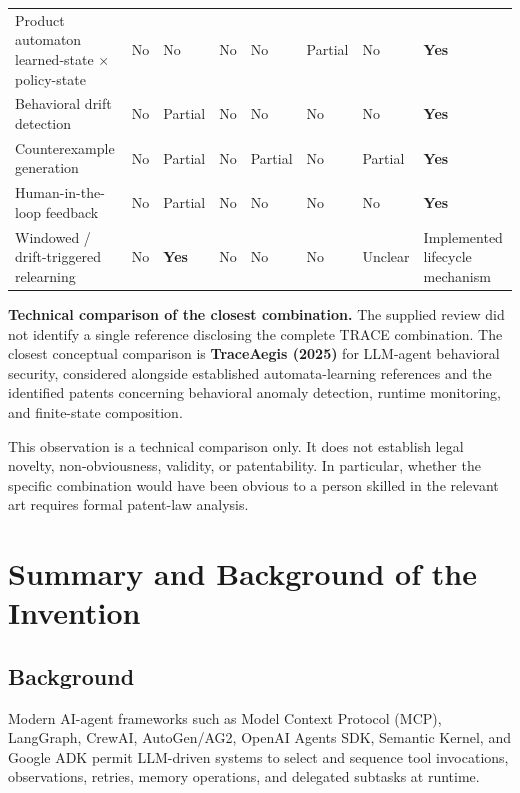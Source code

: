 \documentclass[11pt,a4paper]{article}
\newcommand{\yes}{\textcolor{yesgreen}{\textbf{Yes}}}
\newcommand{\no}{\textcolor{nored}{No}}
\newcommand{\partialmark}{\textcolor{partialorange}{Partial}}
\begin{document}
\begin{landscape}
\begin{longtable}{L{4.1cm} C{1.9cm} C{1.9cm} C{1.9cm} C{1.9cm} C{1.9cm} C{2.1cm} C{1.6cm}}
Product automaton learned-state $\times$ policy-state &
\no & \no & \no & \no & \partialmark & \no & \yes \\

Behavioral drift detection &
\no & \partialmark & \no & \no & \no & \no & \yes \\

Counterexample generation &
\no & \partialmark & \no & \partialmark & \no & \partialmark & \yes \\

Human-in-the-loop feedback &
\no & \partialmark & \no & \no & \no & \no & \yes \\

Windowed / drift-triggered relearning &
\no & \yes & \no & \no & \no & Unclear & Implemented lifecycle mechanism \\

\bottomrule
\end{longtable}
\end{landscape}

\noindent\textbf{Technical comparison of the closest combination.}
The supplied review did not identify a single reference disclosing the complete TRACE
combination. The closest conceptual comparison is \textbf{TraceAegis (2025)} for
LLM-agent behavioral security, considered alongside established automata-learning
references and the identified patents concerning behavioral anomaly detection, runtime
monitoring, and finite-state composition.

This observation is a technical comparison only. It does not establish legal novelty,
non-obviousness, validity, or patentability. In particular, whether the specific
combination would have been obvious to a person skilled in the relevant art requires
formal patent-law analysis.

\section{Summary and Background of the Invention}

\subsection{Background}

Modern AI-agent frameworks such as Model Context Protocol (MCP), LangGraph, CrewAI,
AutoGen/AG2, OpenAI Agents SDK, Semantic Kernel, and Google ADK permit LLM-driven
systems to select and sequence tool invocations, observations, retries, memory operations,
and delegated subtasks at runtime.
\end{document}
